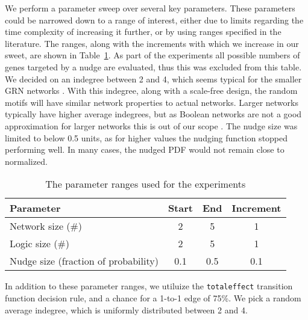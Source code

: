 \documentclass[../main.tex]{subfiles}
\begin{document}
We perform a parameter sweep over several key parameters.
These parameters could be narrowed down to a range of interest, either due to limits regarding the time complexity of increasing it further, or by using ranges specified in the literature.
The ranges, along with the increments with which we increase in our sweet, are shown in Table~\ref{parameters}.
As part of the experiments all possible numbers of genes targeted by a nudge are evaluated, thus this was excluded from this table.
We decided on an indegree between 2 and 4, which seems typical for the smaller GRN networks \cite{lahdesmaki2003learning}.
With this indegree, along with a scale-free design, the random motifs will have similar network properties to actual networks.
Larger networks typically have higher average indegrees, but as Boolean networks are not a good approximation for larger networks this is out of our scope \cite{lahdesmaki2003learning, karlebach2008modelling}.
The nudge size was limited to below 0.5 units, as for higher values the nudging function stopped performing well.
In many cases, the nudged PDF would not remain close to normalized.

\begin{table}
\begin{center}
\label{parameters}
\caption{The parameter ranges used for the experiments}
\begin{tabular}{| l | c | c | c |}
\hline
Parameter & Start & End & Increment \\
\hline
Network size (\#) & 2 & 5 & 1 \\
Logic size (\#) & 2 & 5 & 1 \\
Nudge size (fraction of probability) & 0.1 & 0.5 & 0.1 \\
\hline
\end{tabular}
\end{center}
\end{table}

In addition to these parameter ranges, we utiluize the \texttt{totaleffect} transition function decision rule, and a chance for a 1-to-1 edge of 75\%.
We pick a random average indegree, which is uniformly distributed between 2 and 4.
\end{document}
